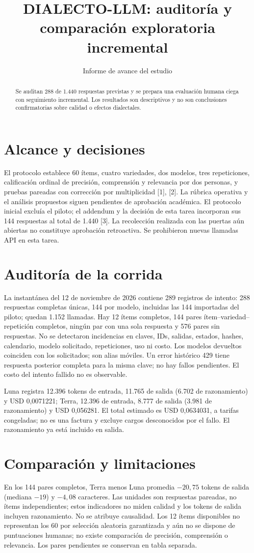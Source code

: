 \documentclass[conference]{IEEEtran}
\title{DIALECTO-LLM: auditoría y comparación exploratoria incremental}
\author{Informe de avance del estudio}
\begin{document}
\maketitle
\begin{abstract}
Se auditan 288 de 1.440 respuestas previstas y se prepara una evaluación humana ciega con seguimiento incremental. Los resultados son descriptivos y no son conclusiones confirmatorias sobre calidad o efectos dialectales.
\end{abstract}
\section{Alcance y decisiones}
El protocolo establece 60 ítems, cuatro variedades, dos modelos, tres repeticiones, calificación ordinal de precisión, comprensión y relevancia por dos personas, y pruebas pareadas con corrección por multiplicidad [1], [2]. La rúbrica operativa y el análisis propuestos siguen pendientes de aprobación académica. El protocolo inicial excluía el piloto; el addendum y la decisión de esta tarea incorporan sus 144 respuestas al total de 1.440 [3]. La recolección realizada con las puertas aún abiertas no constituye aprobación retroactiva. Se prohibieron nuevas llamadas API en esta tarea.
\section{Auditoría de la corrida}
La instantánea del 12 de noviembre de 2026 contiene 289 registros de intento: 288 respuestas completas únicas, 144 por modelo, incluidas las 144 importadas del piloto; quedan 1.152 llamadas. Hay 12 ítems completos, 144 pares ítem--variedad--repetición completos, ningún par con una sola respuesta y 576 pares sin respuestas. No se detectaron incidencias en claves, IDs, salidas, estados, hashes, calendario, modelo solicitado, repeticiones, uso ni costo. Los modelos devueltos coinciden con los solicitados; son alias móviles. Un error histórico 429 tiene respuesta posterior completa para la misma clave; no hay fallos pendientes. El costo del intento fallido no es observable.

Luna registra 12.396 tokens de entrada, 11.765 de salida (6.702 de razonamiento) y USD 0,0071221; Terra, 12.396 de entrada, 8.777 de salida (3.981 de razonamiento) y USD 0,056281. El total estimado es USD 0,0634031, a tarifas congeladas; no es una factura y excluye cargos desconocidos por el fallo. El razonamiento ya está incluido en salida.
\section{Comparación y limitaciones}
En los 144 pares completos, Terra menos Luna promedia $-20{,}75$ tokens de salida (mediana $-19$) y $-4{,}08$ caracteres. Las unidades son respuestas pareadas, no ítems independientes; estos indicadores no miden calidad y los tokens de salida incluyen razonamiento. No se atribuye causalidad. Los 12 ítems disponibles no representan los 60 por selección aleatoria garantizada y aún no se dispone de puntuaciones humanas; no existe comparación de precisión, comprensión o relevancia. Los pares pendientes se conservan en tabla separada.
\end{document}
